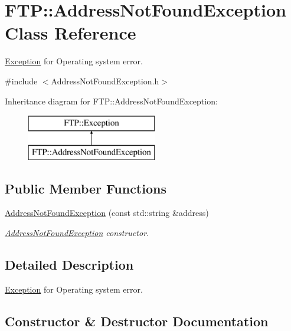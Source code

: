 \hypertarget{classFTP_1_1AddressNotFoundException}{}\section{F\+T\+P\+:\+:Address\+Not\+Found\+Exception Class Reference}
\label{classFTP_1_1AddressNotFoundException}


\hyperlink{classFTP_1_1Exception}{Exception} for Operating system error.  




{\ttfamily \#include $<$Address\+Not\+Found\+Exception.\+h$>$}

Inheritance diagram for F\+T\+P\+:\+:Address\+Not\+Found\+Exception\+:\begin{figure}[H]
\begin{center}
\leavevmode
\includegraphics[height=2.000000cm]{classFTP_1_1AddressNotFoundException}
\end{center}
\end{figure}
\subsection*{Public Member Functions}
\begin{DoxyCompactItemize}
\item 
\hyperlink{classFTP_1_1AddressNotFoundException_a0a1d6bf81c4f0a1b1de50d253a187724}{Address\+Not\+Found\+Exception} (const std\+::string \&address)
\begin{DoxyCompactList}\small\item\em \hyperlink{classFTP_1_1AddressNotFoundException}{Address\+Not\+Found\+Exception} constructor. \end{DoxyCompactList}\end{DoxyCompactItemize}


\subsection{Detailed Description}
\hyperlink{classFTP_1_1Exception}{Exception} for Operating system error. 

\subsection{Constructor \& Destructor Documentation}
\hypertarget{classFTP_1_1AddressNotFoundException_a0a1d6bf81c4f0a1b1de50d253a187724}{}
